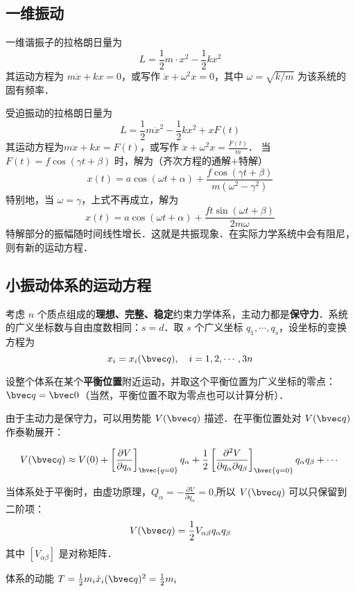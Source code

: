 

\subsection{一维振动}
一维谐振子的拉格朗日量为
\begin{equation}
L=\frac{1}{2}m\cdot{x}^2-\frac{1}{2}kx^2
\end{equation}
其运动方程为 $m\ddot {x}+kx=0$，或写作 $\ddot{x}+\omega^2 x=0$，其中 $\omega=\sqrt{k/m}$ 为该系统的固有频率．

受迫振动的拉格朗日量为 
\begin{equation}
L=\frac{1}{2}m\dot{x}^2-\frac{1}{2}kx^2+xF(t)
\end{equation}
其运动方程为$m\ddot{x}+kx=F(t)$，或写作 $\ddot{x}+\omega^2 x=\frac{F(t)}{m}$．
当 $F(t)=f\cos(\gamma t+\beta)$ 时，解为（齐次方程的通解+特解）
\begin{equation}
x(t)=a\cos(\omega t+\alpha)+\frac{f\cos(\gamma t+\beta)}{m(\omega^2-\gamma^2)}
\end{equation}
特别地，当 $\omega=\gamma$，上式不再成立，解为
\begin{equation}
x(t)=a \cos(\omega t+\alpha)+\frac{ft \sin(\omega t+\beta)}{2m\omega}
\end{equation}
特解部分的振幅随时间线性增长．这就是共振现象．在实际力学系统中会有阻尼，则有新的运动方程．

\subsection{小振动体系的运动方程}
考虑 $n$ 个质点组成的\textbf{理想、完整、稳定}约束力学体系，主动力都是\textbf{保守力}．系统的广义坐标数与自由度数相同：$s=d$．取 $s$ 个广义坐标 $q_1,\cdots,q_s$，设坐标的变换方程为
\begin{equation}
x_i = x_i(\bvec q),\ \ \  i=1,2,\cdots,3n
\end{equation}

设整个体系在某个\textbf{平衡位置}附近运动，并取这个平衡位置为广义坐标的零点：$\bvec q=\bvec 0$（当然，平衡位置不取为零点也可以计算分析）．

由于主动力是保守力，可以用势能 $V(\bvec q)$ 描述．在平衡位置处对 $V(\bvec q)$ 作泰勒展开：

\begin{equation}
V(\bvec q)\approx V(0)+\left[\frac{\partial V}{\partial q_\alpha}\right]_\bvec {q=0} q_\alpha+\frac{1}{2}\left[\frac{\partial^2V}{\partial q_\alpha\partial q_\beta}\right]_\bvec{q=0}q_\alpha q_\beta+\cdots
\end{equation}

当体系处于平衡时，由虚功原理，$Q_\alpha=-\frac{\partial V}{\partial q_\alpha}=0$,所以 $V(\bvec q)$ 可以只保留到二阶项：
\begin{equation}
V(\bvec q)=\frac{1}{2}V_{\alpha\beta}q_\alpha q_\beta
\end{equation}
其中 $[V_{\alpha\beta}]$ 是对称矩阵．

体系的动能 $T=\frac{1}{2}m_i\dot{x}_i(\bvec q)^2=\frac{1}{2}m_i$